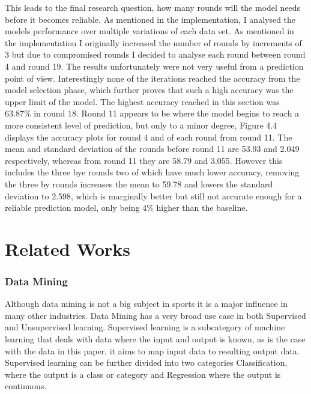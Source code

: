 \documentclass{imc-inf}
\begin{document}
	This leads to the final research question, how many rounds will the model needs before it becomes reliable. As mentioned in the implementation, I analysed the models performance over multiple variations of each data set. As mentioned in the implementation I originally increased the number of rounds by increments of 3 but due to compromised rounds I decided to analyse each round between round 4 and round 19. 
	The results unfortunately were not very useful from a prediction point of view. Interestingly none of the iterations reached the accuracy from the model selection phase, which further proves that such a high accuracy was the upper limit of the model. The highest accuracy reached in this section was 63.87\% in round 18. 
	Round 11 appears to be where the model begins to reach a more consistent level of prediction, but only to a minor degree, Figure 4.4 displays the accuracy plots for round 4 and of each round from round 11. The mean and standard deviation of the rounds before round 11 are 53.93 and 2.049 respectively, whereas from round 11 they are 58.79 and 3.055. However this includes the three bye rounds two of which have much lower accuracy, removing the three by rounds increases the mean to 59.78 and lowers the standard deviation to 2.598, which is marginally better but still not accurate enough for a reliable prediction model, only being 4\% higher than the baseline.
	
		
	\chapter{Related Works}\label{chap:related_works}
	\subsection{Data Mining}
	Although data mining is not a big subject in sports it is a major influence in many other industries. Data Mining has a very broad use case in both Supervised and Unsupervised learning. Supervised learning is a subcategory of machine learning that deals with data where the input and output is known, as is the case with the data in this paper, it aims to map input data to resulting output data. Supervised learning can be further divided into two categories Classification, where the output is a class or category and Regression where the output is continuous. 
	
\end{document}
